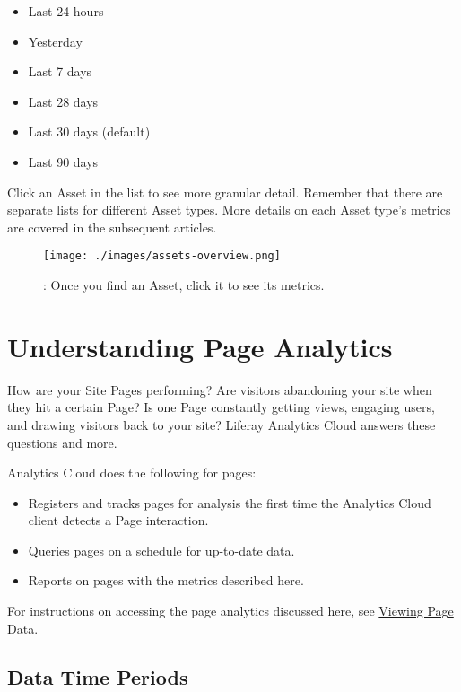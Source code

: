 \begin{itemize}
\tightlist
\item
  Last 24 hours
\item
  Yesterday
\item
  Last 7 days
\item
  Last 28 days
\item
  Last 30 days (default)
\item
  Last 90 days
\end{itemize}

Click an Asset in the list to see more granular detail. Remember that
there are separate lists for different Asset types. More details on each
Asset type's metrics are covered in the subsequent articles.

\begin{figure}
\centering
\texttt{[image: ./images/assets-overview.png]}
\caption{: Once you find an Asset, click it to see its metrics.}
\end{figure}

\section{Understanding Page
Analytics}\label{understanding-page-analytics}

How are your Site Pages performing? Are visitors abandoning your site
when they hit a certain Page? Is one Page constantly getting views,
engaging users, and drawing visitors back to your site? Liferay
Analytics Cloud answers these questions and more.

Analytics Cloud does the following for pages:

\begin{itemize}
\tightlist
\item
  Registers and tracks pages for analysis the first time the Analytics
  Cloud client detects a Page interaction.
\item
  Queries pages on a schedule for up-to-date data.
\item
  Reports on pages with the metrics described here.
\end{itemize}

For instructions on accessing the page analytics discussed here, see
\href{https://github.com/liferay/liferay-docs/blob/7.1.x/en/discover/analytics-cloud/articles/04-analyzing-touchpoints/00-analytics-intro.markdown\#viewing-page-data}{Viewing
Page Data}.

\subsection{Data Time Periods}\label{data-time-periods}

